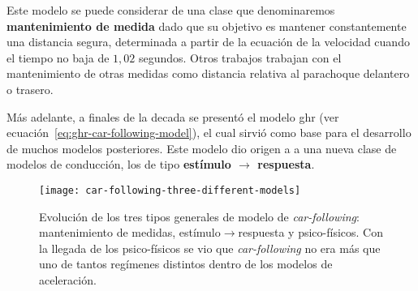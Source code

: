 Este modelo se puede considerar de una clase que denominaremos \textbf{mantenimiento de medida} dado que su objetivo es mantener constantemente una distancia segura, determinada a partir de la ecuación de la velocidad cuando el tiempo no baja de $1,02$ segundos. Otros trabajos trabajan con el mantenimiento de otras medidas como distancia relativa al parachoque delantero o trasero.


Más adelante, a finales de la decada se presentó el modelo \gls{ghr} (ver ecuación~\ref{eq:ghr-car-following-model}), el cual sirvió como base para el desarrollo de muchos modelos posteriores. Este modelo dio origen a a una nueva clase de modelos de conducción, los de tipo \textbf{estímulo $\rightarrow$ respuesta}. 

\begin{figure}[t]
	\centering
	\texttt{[image: car-following-three-different-models]}
	\caption[Evolución de los tres tipos generales de modelo de \textit{car-following}]{Evolución de los tres tipos generales de modelo de \textit{\gls{car-following}}: mantenimiento de medidas, estímulo$\rightarrow$respuesta y psico-físicos. Con la llegada de los psico-físicos se vio que \textit{\gls{car-following}} no era más que uno de tantos regímenes distintos dentro de los modelos de aceleración.}
	\label{fig:car-following-three-different-models}
\end{figure}

